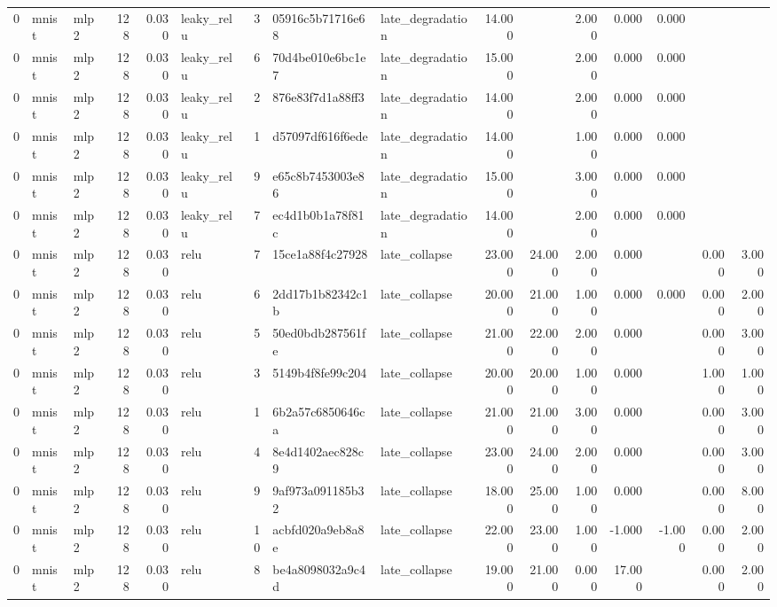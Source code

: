 \begin{table}[htbp]
{\begin{tabular}{@{}rllrrlrllrrrrrrr@{}}
0 & mnist & mlp2 & 128 & 0.030 & leaky\_relu & 3 & 05916c5b71716e68 & late\_degradation & 14.000 &  & 2.000 & 0.000 & 0.000 &  &  \\
0 & mnist & mlp2 & 128 & 0.030 & leaky\_relu & 6 & 70d4be010e6bc1e7 & late\_degradation & 15.000 &  & 2.000 & 0.000 & 0.000 &  &  \\
0 & mnist & mlp2 & 128 & 0.030 & leaky\_relu & 2 & 876e83f7d1a88ff3 & late\_degradation & 14.000 &  & 2.000 & 0.000 & 0.000 &  &  \\
0 & mnist & mlp2 & 128 & 0.030 & leaky\_relu & 1 & d57097df616f6ede & late\_degradation & 14.000 &  & 1.000 & 0.000 & 0.000 &  &  \\
0 & mnist & mlp2 & 128 & 0.030 & leaky\_relu & 9 & e65c8b7453003e86 & late\_degradation & 15.000 &  & 3.000 & 0.000 & 0.000 &  &  \\
0 & mnist & mlp2 & 128 & 0.030 & leaky\_relu & 7 & ec4d1b0b1a78f81c & late\_degradation & 14.000 &  & 2.000 & 0.000 & 0.000 &  &  \\
0 & mnist & mlp2 & 128 & 0.030 & relu & 7 & 15ce1a88f4c27928 & late\_collapse & 23.000 & 24.000 & 2.000 & 0.000 &  & 0.000 & 3.000 \\
0 & mnist & mlp2 & 128 & 0.030 & relu & 6 & 2dd17b1b82342c1b & late\_collapse & 20.000 & 21.000 & 1.000 & 0.000 & 0.000 & 0.000 & 2.000 \\
0 & mnist & mlp2 & 128 & 0.030 & relu & 5 & 50ed0bdb287561fe & late\_collapse & 21.000 & 22.000 & 2.000 & 0.000 &  & 0.000 & 3.000 \\
0 & mnist & mlp2 & 128 & 0.030 & relu & 3 & 5149b4f8fe99c204 & late\_collapse & 20.000 & 20.000 & 1.000 & 0.000 &  & 1.000 & 1.000 \\
0 & mnist & mlp2 & 128 & 0.030 & relu & 1 & 6b2a57c6850646ca & late\_collapse & 21.000 & 21.000 & 3.000 & 0.000 &  & 0.000 & 3.000 \\
0 & mnist & mlp2 & 128 & 0.030 & relu & 4 & 8e4d1402aec828c9 & late\_collapse & 23.000 & 24.000 & 2.000 & 0.000 &  & 0.000 & 3.000 \\
0 & mnist & mlp2 & 128 & 0.030 & relu & 9 & 9af973a091185b32 & late\_collapse & 18.000 & 25.000 & 1.000 & 0.000 &  & 0.000 & 8.000 \\
0 & mnist & mlp2 & 128 & 0.030 & relu & 10 & acbfd020a9eb8a8e & late\_collapse & 22.000 & 23.000 & 1.000 & -1.000 & -1.000 & 0.000 & 2.000 \\
0 & mnist & mlp2 & 128 & 0.030 & relu & 8 & be4a8098032a9c4d & late\_collapse & 19.000 & 21.000 & 0.000 & 17.000 &  & 0.000 & 2.000 \\

\end{tabular}}
\end{table}
